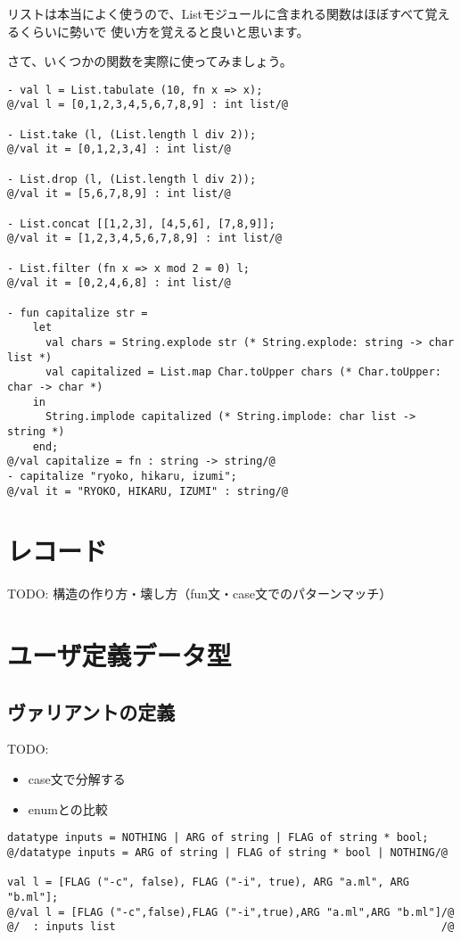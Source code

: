 \documentclass[11pt,a4paper]{article}
\begin{document}
リストは本当によく使うので、Listモジュールに含まれる関数はほぼすべて覚えるくらいに勢いで
使い方を覚えると良いと思います。

さて、いくつかの関数を実際に使ってみましょう。

\begin{lstlisting}[caption=Listモジュール,label=code:list-mod]
- val l = List.tabulate (10, fn x => x);
@/val l = [0,1,2,3,4,5,6,7,8,9] : int list/@

- List.take (l, (List.length l div 2));
@/val it = [0,1,2,3,4] : int list/@

- List.drop (l, (List.length l div 2));
@/val it = [5,6,7,8,9] : int list/@

- List.concat [[1,2,3], [4,5,6], [7,8,9]];
@/val it = [1,2,3,4,5,6,7,8,9] : int list/@

- List.filter (fn x => x mod 2 = 0) l;
@/val it = [0,2,4,6,8] : int list/@

- fun capitalize str =
    let
      val chars = String.explode str (* String.explode: string -> char list *)
      val capitalized = List.map Char.toUpper chars (* Char.toUpper: char -> char *)
    in
      String.implode capitalized (* String.implode: char list -> string *)
    end;
@/val capitalize = fn : string -> string/@
- capitalize "ryoko, hikaru, izumi";
@/val it = "RYOKO, HIKARU, IZUMI" : string/@
\end{lstlisting}


\section{レコード}
TODO:
構造の作り方・壊し方（fun文・case文でのパターンマッチ）

\section{ユーザ定義データ型}
\subsection{ヴァリアントの定義}
TODO:
\begin{itemize}
\item case文で分解する
\item enumとの比較
\end{itemize}

\begin{lstlisting}[caption=単純なヴァリアント,label=code:variants]
datatype inputs = NOTHING | ARG of string | FLAG of string * bool;
@/datatype inputs = ARG of string | FLAG of string * bool | NOTHING/@

val l = [FLAG ("-c", false), FLAG ("-i", true), ARG "a.ml", ARG "b.ml"];
@/val l = [FLAG ("-c",false),FLAG ("-i",true),ARG "a.ml",ARG "b.ml"]/@
@/  : inputs list                                                   /@
\end{lstlisting}
\end{document}
